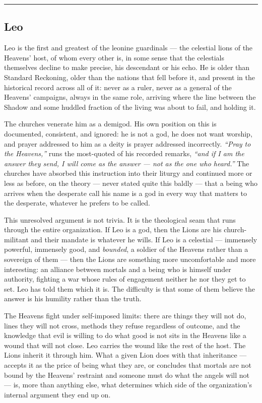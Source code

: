 \medskip\hrule\medskip

\subsection{Leo}

Leo is the first and greatest of the leonine guardinals --- the celestial lions of the Heavens' host, of whom every other is, in some sense that the celestials themselves decline to make precise, his descendant or his echo. He is older than Standard Reckoning, older than the nations that fell before it, and present in the historical record across all of it: never as a ruler, never as a general of the Heavens' campaigns, always in the same role, arriving where the line between the Shadow and some huddled fraction of the living was about to fail, and holding it.

The churches venerate him as a demigod. His own position on this is documented, consistent, and ignored: he is not a god, he does not want worship, and prayer addressed to him as a deity is prayer addressed incorrectly. \textit{``Pray to the Heavens,''} runs the most-quoted of his recorded remarks, \textit{``and if I am the answer they send, I will come as the answer --- not as the one who heard.''} The churches have absorbed this instruction into their liturgy and continued more or less as before, on the theory --- never stated quite this baldly --- that a being who arrives when the desperate call his name is a god in every way that matters to the desperate, whatever he prefers to be called.

This unresolved argument is not trivia. It is the theological seam that runs through the entire organization. If Leo is a god, then the Lions are his church-militant and their mandate is whatever he wills. If Leo is a celestial --- immensely powerful, immensely good, and \textit{bounded}, a soldier of the Heavens rather than a sovereign of them --- then the Lions are something more uncomfortable and more interesting: an alliance between mortals and a being who is himself under authority, fighting a war whose rules of engagement neither he nor they get to set. Leo has told them which it is. The difficulty is that some of them believe the answer is his humility rather than the truth.

The Heavens fight under self-imposed limits: there are things they will not do, lines they will not cross, methods they refuse regardless of outcome, and the knowledge that evil is willing to do what good is not sits in the Heavens like a wound that will not close. Leo carries the wound like the rest of the host. The Lions inherit it through him. What a given Lion does with that inheritance --- accepts it as the price of being what they are, or concludes that mortals are not bound by the Heavens' restraint and someone must do what the angels will not --- is, more than anything else, what determines which side of the organization's internal argument they end up on.

